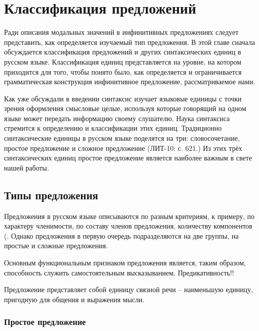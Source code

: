 \section{Классификация предложений}

Ради описания модальных значений в инфинитивных предложениях следует представить, как определяется изучаемый тип предложения. В этой главе сначала обсуждается классификация предложений и других синтаксических единиц в русском языке. Классификация единиц представляется на уровне, на котором приходится для того, чтобы понято было, как определяется и ограничивается грамматическая конструкция инфинитивное предложение, рассматриваемое нами.

Как уже обсуждали в введении синтаксис изучает языковые единицы с точки зрения оформления смысловые целые, используя которые говорящий на одном языке может передать информацию своему слушателю. Наука синтаксиса стремится к определению и классификации этих единиц. Традиционно синтаксические единицы в русском языке поделятся на три: словосочетание, простое предложение и сложное предложение (ЛИТ-10: с. 621.) Из этих трёх синтаксических единиц простое предложение является наиболее важным в свете нашей работы.



\subsection{Типы предложения}


Предложения в русском языке описываются по разным критериям, к примеру, по характеру членимости, по составу членов предложения, количеству компонентов (. Однако предложения в первую очередь подразделяются на две группы, на простые и сложные предложения. 


Основным функциональным признаком предложения является, таким образом, способность служить самостоятельным высказыванием. Предикативность!!

Предложение представляет собой единицу связной речи -- наименьшую единицу, пригодную для общения и выражения мысли.

\subsubsection{Простое предложение}





